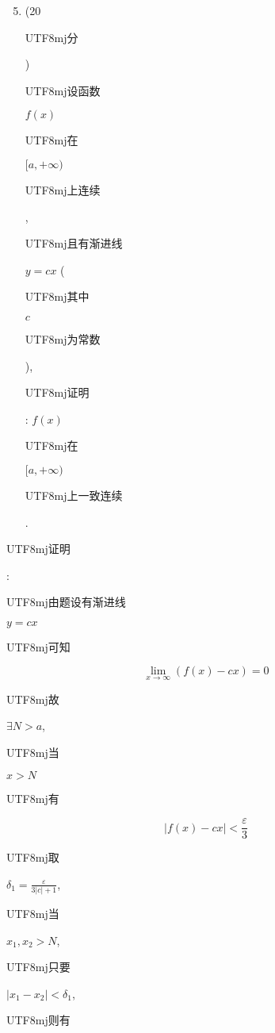 \documentclass[10pt]{article}
\begin{document}
\begin{enumerate}
  \setcounter{enumi}{4}
  \item (20 \begin{CJK}{UTF8}{mj}分\end{CJK}) \begin{CJK}{UTF8}{mj}设函数\end{CJK} $f(x)$ \begin{CJK}{UTF8}{mj}在\end{CJK} $[a,+\infty)$ \begin{CJK}{UTF8}{mj}上连续\end{CJK}, \begin{CJK}{UTF8}{mj}且有渐进线\end{CJK} $y=c x$ (\begin{CJK}{UTF8}{mj}其中\end{CJK} $c$ \begin{CJK}{UTF8}{mj}为常数\end{CJK}), \begin{CJK}{UTF8}{mj}证明\end{CJK}: $f(x)$ \begin{CJK}{UTF8}{mj}在\end{CJK} $[a,+\infty)$ \begin{CJK}{UTF8}{mj}上一致连续\end{CJK}.
\end{enumerate}
\begin{CJK}{UTF8}{mj}证明\end{CJK}: \begin{CJK}{UTF8}{mj}由题设有渐进线\end{CJK} $y=c x$ \begin{CJK}{UTF8}{mj}可知\end{CJK}
$$
\lim _{x \rightarrow \infty}(f(x)-c x)=0
$$
\begin{CJK}{UTF8}{mj}故\end{CJK} $\exists N>a$, \begin{CJK}{UTF8}{mj}当\end{CJK} $x>N$ \begin{CJK}{UTF8}{mj}有\end{CJK}
$$
|f(x)-c x|<\frac{\varepsilon}{3}
$$
\begin{CJK}{UTF8}{mj}取\end{CJK} $\delta_{1}=\frac{\varepsilon}{3|c|+1}$, \begin{CJK}{UTF8}{mj}当\end{CJK} $x_{1}, x_{2}>N$, \begin{CJK}{UTF8}{mj}只要\end{CJK} $\left|x_{1}-x_{2}\right|<\delta_{1}$, \begin{CJK}{UTF8}{mj}则有\end{CJK}
\end{document}
